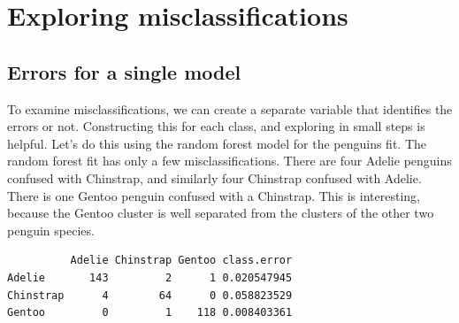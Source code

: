 \documentclass[
  letterpaper,
]{krantz}
\newenvironment{Shaded}{\begin{snugshade}}{\end{snugshade}}
\newcommand{\AttributeTok}[1]{\textcolor[rgb]{0.40,0.45,0.13}{#1}}
\newcommand{\DecValTok}[1]{\textcolor[rgb]{0.68,0.00,0.00}{#1}}
\newcommand{\FunctionTok}[1]{\textcolor[rgb]{0.28,0.35,0.67}{#1}}
\newcommand{\NormalTok}[1]{\textcolor[rgb]{0.00,0.23,0.31}{#1}}
\newcommand{\OtherTok}[1]{\textcolor[rgb]{0.00,0.23,0.31}{#1}}
\newcommand{\SpecialCharTok}[1]{\textcolor[rgb]{0.37,0.37,0.37}{#1}}
\begin{document}

\chapter{Exploring
misclassifications}\label{exploring-misclassifications}


\section{Errors for a single model}\label{errors-for-a-single-model}

To examine misclassifications, we can create a separate variable that
identifies the errors or not. Constructing this for each class, and
exploring in small steps is helpful. Let's do this using the random
forest model for the penguins fit. The random forest fit has only a few
misclassifications. There are four Adelie penguins confused with
Chinstrap, and similarly four Chinstrap confused with Adelie. There is
one Gentoo penguin confused with a Chinstrap. This is interesting,
because the Gentoo cluster is well separated from the clusters of the
other two penguin species.


\begin{Shaded}
\end{Shaded}

\begin{verbatim}
          Adelie Chinstrap Gentoo class.error
Adelie       143         2      1 0.020547945
Chinstrap      4        64      0 0.058823529
Gentoo         0         1    118 0.008403361
\end{verbatim}

\begin{Shaded}
\end{Shaded}
\end{document}
